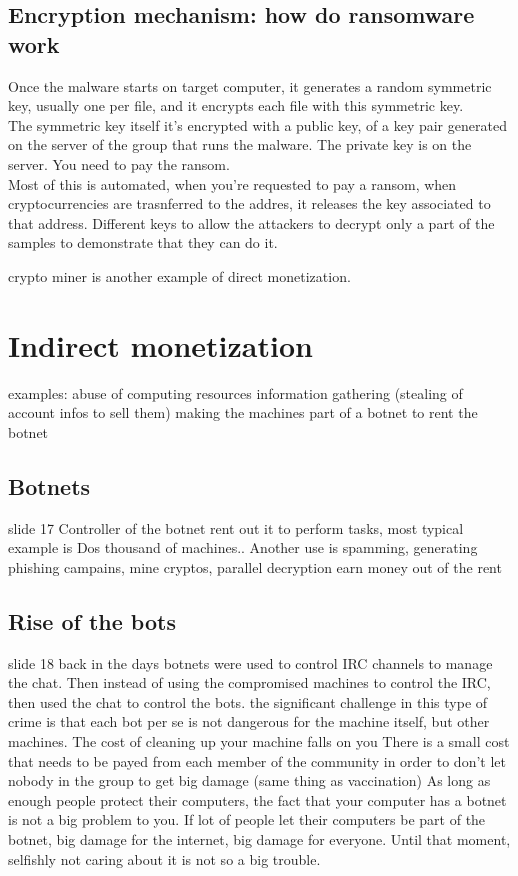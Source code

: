 \subsection{Encryption mechanism: how do ransomware work}
    Once the malware starts on target computer, it generates a random symmetric key, usually one per file, and it encrypts each file with this symmetric key.\\
    The symmetric key itself it's encrypted with a public key, of a key pair generated on the server of the group that runs the malware. The private key is on the server. You need to pay the ransom.
    \\Most of this is automated, when you're requested to pay a ransom, when cryptocurrencies are trasnferred to the addres, it releases the key associated to that address.
    Different keys to allow the attackers to decrypt only a part of the samples to demonstrate that they can do it.

crypto miner is another example of direct monetization.


\section{Indirect monetization}
    examples: abuse of computing resources
    information gathering (stealing of account infos to sell them)
    making the machines part of a botnet to rent the botnet

    \subsection[short]{Botnets}
        slide 17 
        Controller of the botnet rent out it to perform tasks, most typical example is Dos
        thousand of machines..
        Another use is spamming, generating phishing campains, mine cryptos, parallel decryption
        earn money out of the rent

    \subsection{Rise of the bots}
        slide 18
        back in the days botnets were used to control IRC channels to manage the chat.
        Then instead of using the compromised machines to control the IRC, then used the chat to control the bots.
        the significant challenge in this type of crime is that each bot per se is not dangerous for the machine itself, but other machines.
        The cost of cleaning up your machine falls on you 
        There is a small cost that needs to be payed from each member of the community in order to don't let nobody in the group to get big damage
        (same thing as vaccination)
        As long as enough people protect their computers, the fact that your computer has a botnet is not a big problem to you.
        If lot of people let their computers be part of the botnet, big damage for the internet, big damage for everyone.
        Until that moment, selfishly not caring about it is not so a big trouble.


